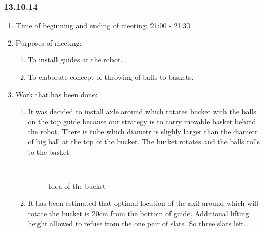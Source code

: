 
\subsubsection{13.10.14}

\begin{enumerate}
	\item Time of beginning and ending of meeting:
	21:00 - 21:30
	\item Purposes of meeting:
	\begin{enumerate}
	  \item To install guides at the robot.
	  
	  \item To elaborate concept of throwing of balls to baskets.
	  
    \end{enumerate}
	\item Work that has been done:
	\begin{enumerate}
	  \item It was decided to install axle around which rotates bucket with the balls on the top guide because our strategy is to carry movable basket behind the robot. There is tube which diametr is slighly larger than the diametr of big ball at the top of the bucket. The bucket rotates and the balls rolls to the basket.
	  \begin{figure}[H]
	  	\begin{minipage}[h]{0.2\linewidth}
	  		\center  
	  	\end{minipage}
	  	\begin{minipage}[h]{0.6\linewidth}
	  		\caption{Idea of the bucket}
	  	\end{minipage}
	  \end{figure}
      
      \item It has been estimated that optimal location of the axil around which will rotate the bucket is 20cm from the bottom of guide. Additional lifting height allowed to refuse from the one pair of slats. So three slats left.
      

\end{enumerate}
\end{enumerate}
